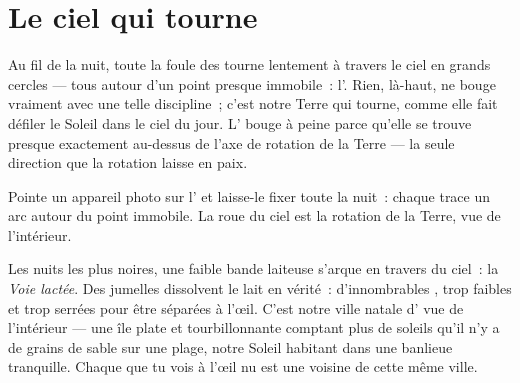 \section{Le ciel qui tourne}

\begin{proposition}\label{prop:g5:stars-night-sky:wheel}
Au fil de la nuit, toute la foule des  tourne lentement à
travers le ciel en grands cercles --- tous autour d'un point presque
immobile~: l'. Rien, là-haut, ne bouge vraiment avec
une telle discipline~; c'est notre Terre qui tourne, comme elle fait
défiler le Soleil dans le ciel du jour. L' bouge à
peine parce qu'elle se trouve presque exactement au-dessus de l'axe
de rotation de la Terre --- la seule direction que la rotation laisse
en paix.
\end{proposition}

\begin{omfigure}

{\small Pointe un appareil photo sur l' et laisse-le
fixer toute la nuit~: chaque  trace un arc autour du point
immobile. La roue du ciel est la rotation de la Terre, vue de
l'intérieur.}
\end{omfigure}

\begin{example}\label{ex:g5:stars-night-sky:milkyway}
Les nuits les plus noires, une faible bande laiteuse s'arque en
travers du ciel~: la \emph{Voie lactée}. Des
jumelles dissolvent le lait en vérité~: d'innombrables , trop
faibles et trop serrées pour être séparées à l'œil. C'est notre ville
natale d' vue de l'intérieur --- une île plate et tourbillonnante
comptant plus de soleils qu'il n'y a de grains de sable sur une
plage, notre Soleil habitant dans une banlieue tranquille. Chaque
 que tu vois à l'œil nu est une voisine de cette même ville.
\end{example}

